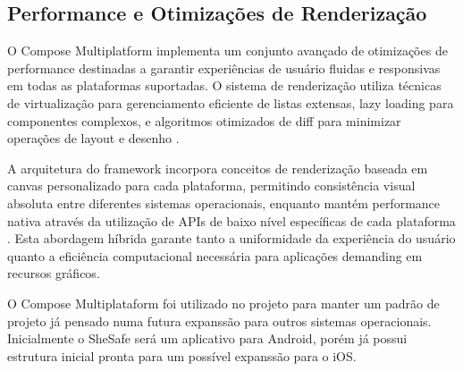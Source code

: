 \subsection{Performance e Otimizações de Renderização}

O Compose Multiplatform implementa um conjunto avançado de otimizações de performance destinadas a garantir experiências de usuário fluidas e responsivas em todas as plataformas suportadas. O sistema de renderização utiliza técnicas de virtualização para gerenciamento eficiente de listas extensas, lazy loading para componentes complexos, e algoritmos otimizados de diff para minimizar operações de layout e desenho \cite{compose2023performance}.

A arquitetura do framework incorpora conceitos de renderização baseada em canvas personalizado para cada plataforma, permitindo consistência visual absoluta entre diferentes sistemas operacionais, enquanto mantém performance nativa através da utilização de APIs de baixo nível específicas de cada plataforma \cite{skia2023graphics}. Esta abordagem híbrida garante tanto a uniformidade da experiência do usuário quanto a eficiência computacional necessária para aplicações demanding em recursos gráficos.

O Compose Multiplataform foi utilizado no projeto para manter um padrão de projeto já pensado numa futura expanssão para outros sistemas operacionais. Inicialmente o SheSafe será um aplicativo para Android, porém já possui estrutura inicial pronta para um possível expanssão para o iOS.
